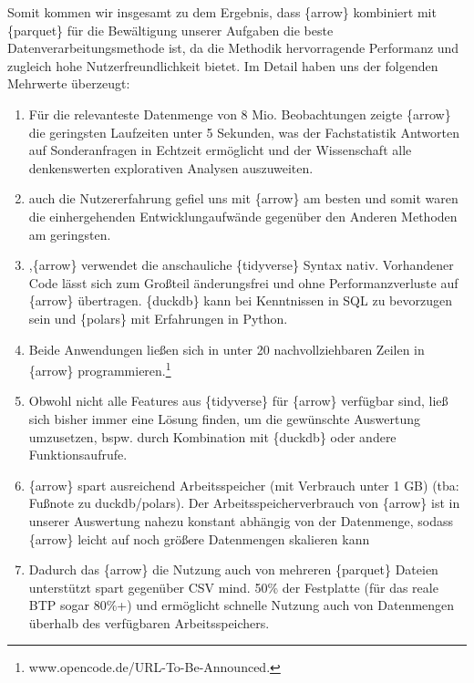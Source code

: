 \documentclass[
  german,
  10pt,
  twoside]{article}
\providecommand{\tightlist}{%
  \setlength{\itemsep}{0pt}\setlength{\parskip}{0pt}}
\begin{document}
Somit kommen wir insgesamt zu dem Ergebnis, dass \{arrow\} kombiniert
mit \{parquet\} für die Bewältigung unserer Aufgaben die beste
Datenverarbeitungsmethode ist, da die Methodik hervorragende Performanz
und zugleich hohe Nutzerfreundlichkeit bietet. Im Detail haben uns der
folgenden Mehrwerte überzeugt:

\begin{enumerate}
\def\labelenumi{\arabic{enumi}.}
\tightlist
\item
  Für die relevanteste Datenmenge von 8 Mio. Beobachtungen zeigte
  \{arrow\} die geringsten Laufzeiten unter 5 Sekunden, was der
  Fachstatistik Antworten auf Sonderanfragen in Echtzeit ermöglicht und
  der Wissenschaft alle denkenswerten explorativen Analysen auszuweiten.
\item
  auch die Nutzererfahrung gefiel uns mit \{arrow\} am besten und somit
  waren die einhergehenden Entwicklungaufwände gegenüber den Anderen
  Methoden am geringsten.
\item
  ,\{arrow\} verwendet die anschauliche \{tidyverse\} Syntax nativ.
  Vorhandener Code lässt sich zum Großteil änderungsfrei und ohne
  Performanzverluste auf \{arrow\} übertragen. \{duckdb\} kann bei
  Kenntnissen in SQL zu bevorzugen sein und \{polars\} mit Erfahrungen
  in Python.
\item
  Beide Anwendungen ließen sich in unter 20 nachvollziehbaren Zeilen in
  \{arrow\} programmieren.\footnote{www.opencode.de/URL-To-Be-Announced.}
\item
  Obwohl nicht alle Features aus \{tidyverse\} für \{arrow\} verfügbar
  sind, ließ sich bisher immer eine Lösung finden, um die gewünschte
  Auswertung umzusetzen, bspw. durch Kombination mit \{duckdb\} oder
  andere Funktionsaufrufe.
\item
  \{arrow\} spart ausreichend Arbeitsspeicher (mit Verbrauch unter 1 GB)
  (tba: Fußnote zu duckdb/polars). Der Arbeitsspeicherverbrauch von
  \{arrow\} ist in unserer Auswertung nahezu konstant abhängig von der
  Datenmenge, sodass \{arrow\} leicht auf noch größere Datenmengen
  skalieren kann
\item
  Dadurch das \{arrow\} die Nutzung auch von mehreren \{parquet\}
  Dateien unterstützt spart gegenüber CSV mind. 50\% der Festplatte (für
  das reale BTP sogar 80\%+) und ermöglicht schnelle Nutzung auch von
  Datenmengen überhalb des verfügbaren Arbeitsspeichers.
\end{enumerate}
\end{document}
